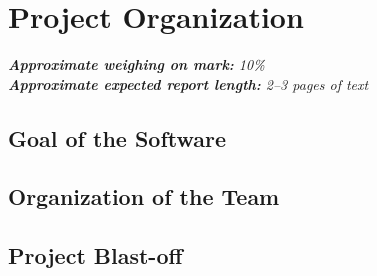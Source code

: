 \section{Project Organization}
\label{sec:project_organization}

\emph{\textbf{Approximate weighing on mark:} 10\%}							\\
\emph{\textbf{Approximate expected report length:} 2--3 pages of text}

\subsection{Goal of the Software}


\subsection{Organization of the Team}


\subsection{Project Blast-off}

